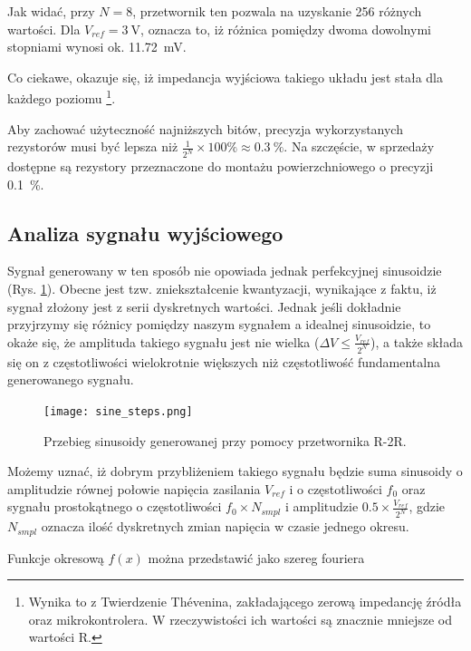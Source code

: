 \documentclass[12pt, a4paper]{article}
\begin{document}
Jak widać, przy $N=8$, przetwornik ten pozwala na uzyskanie 256 różnych wartości. Dla $V_{ref}=\qty{3}{\volt}$,
oznacza to, iż różnica pomiędzy dwoma dowolnymi stopniami wynosi ok. \qty{11,72}{\mV}.

Co ciekawe, okazuje się, iż impedancja wyjściowa takiego układu jest stała dla każdego poziomu
\footnote{
	Wynika to z Twierdzenie Thévenina, zakładającego zerową impedancję źródła oraz mikrokontrolera. 
	W rzeczywistości ich wartości są znacznie mniejsze od wartości R.
}.

Aby zachować użyteczność najniższych bitów, precyzja wykorzystanych rezystorów musi być lepsza niż
$\frac{1}{2^N} \times 100\unit{\percent} \approx \qty{0,3}{\%}$. Na szczęście,
w sprzedaży dostępne są rezystory przeznaczone do montażu powierzchniowego o precyzji \qty{0,1}{\%}.

\subsection{Analiza sygnału wyjściowego}

Sygnał generowany w ten sposób nie opowiada jednak perfekcyjnej sinusoidzie (Rys. \ref{fig:sine-stepped}).
Obecne jest tzw. zniekształcenie kwantyzacji, wynikające z faktu, iż sygnał złożony jest 
z serii dyskretnych wartości. Jednak jeśli dokładnie przyjrzymy się różnicy pomiędzy naszym sygnałem
a idealnej sinusoidzie, to okaże się, że amplituda takiego sygnału jest nie wielka 
($\Delta V \le \frac{V_{ref}}{2^N}$), a także składa się on z częstotliwości wielokrotnie większych niż
częstotliwość fundamentalna generowanego sygnału.

\begin{figure}[h]
	\centering
	\texttt{[image: sine\_steps.png]}
	\caption[short]{Przebieg sinusoidy generowanej przy pomocy przetwornika R-2R.}
	\label{fig:sine-stepped}
\end{figure}


Możemy uznać, iż dobrym przybliżeniem takiego sygnału będzie suma sinusoidy o amplitudzie równej połowie napięcia zasilania $V_{ref}$
i o częstotliwości $f_0$ oraz sygnału prostokątnego o częstotliwości $f_0 \times N_{smpl}$ i amplitudzie $0.5 \times \frac{V_{ref}}{2^N}$, 
gdzie $N_{smpl}$ oznacza ilość dyskretnych zmian napięcia w czasie jednego okresu.


\iffalse
\begin{lemma}
		Funkcje okresową $f(x)$ można przedstawić jako szereg fouriera
\end{lemma}
\end{document}

